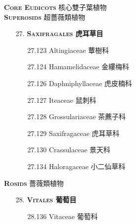 \vspace{2ex} 
\noindent \normalsize\textsc{\textbf{Core Eudicots} 核心雙子葉植物}\selectfont \\
\vspace{2ex} 
\noindent \normalsize\textsc{\textbf{Superosids} 超薔薇類植物}\selectfont \\
\footnotesize\selectfont
\begin{enumerate}
  \item[27. ] \textbf{\textsc{Saxifragales} 虎耳草目} 
    \begin{enumerate}
      \item[27.123] Altingiaceae 蕈樹科  
        
      \item[27.124] Hamamelidaceae 金縷梅科  
        
      \item[27.126] Daphniphyllaceae 虎皮楠科  
        
      \item[27.127] Iteaceae 鼠刺科  
        
      \item[27.128] Grossulariaceae 茶藨子科  
        
      \item[27.129] Saxifragaceae 虎耳草科  
        
      \item[27.130] Crassulaceae 景天科  
        
      \item[27.134] Haloragaceae 小二仙草科  
        
    \end{enumerate}
\end{enumerate}
\vspace{2ex} 
\noindent \normalsize\textsc{\textbf{Rosids} 薔薇類植物}\selectfont \\
\footnotesize\selectfont
\begin{enumerate}
  \item[28. ] \textbf{\textsc{Vitales} 葡萄目} 
    \begin{enumerate}
      \item[28.136] Vitaceae 葡萄科  
        
    \end{enumerate}
\end{enumerate}
